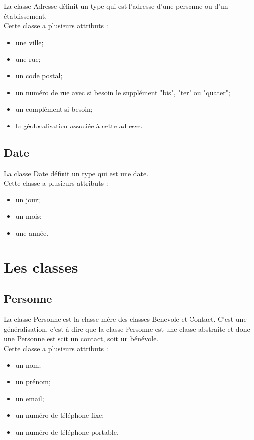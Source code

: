 \documentclass[asi, sansVersion]{picInsa}
\begin{document}
La classe Adresse définit un type qui est l'adresse d'une personne ou d'un établissement.\\
Cette classe a plusieurs attributs : 
\begin{itemize}
\item une ville;
\item une rue;
\item un code postal;
\item un numéro de rue avec si besoin le supplément "bis", "ter" ou "quater";
\item un complément si besoin;
\item la géolocalisation associée à cette adresse.
\end{itemize}

\subsection*{Date}

La classe Date définit un type qui est une date.\\
Cette classe a plusieurs attributs : 
\begin{itemize}
\item un jour;
\item un mois;
\item une année.
\end{itemize}


\section{Les classes}

\subsection*{Personne}

La classe Personne est la classe mère des classes Benevole et Contact. C'est une généralisation, c'est à dire que la classe Personne est une classe abstraite et donc une Personne est soit un contact, soit un bénévole. \\
Cette classe a plusieurs attributs : 
\begin{itemize}
\item un nom;
\item un prénom;
\item un email;
\item un numéro de téléphone fixe;
\item un numéro de téléphone portable.
\end{itemize}
\end{document}
